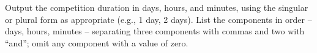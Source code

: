 
  Output the competition duration in days, hours, and minutes, using the singular or plural form as appropriate (e.g., 1 day, 2 days). 
  List the components in order -- days, hours, minutes -- separating three components with commas and two with ``and''; omit any component with a value of zero.
